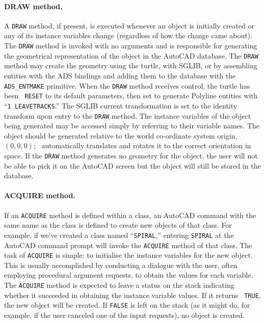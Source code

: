 \documentclass{article}
\begin{document}
\paragraph{DRAW method.}  A {\tt DRAW} method, if present, is executed
        whenever an object is initially created or any of its instance
        variables change (regardless of how the change came about).
        The {\tt DRAW} method is invoked with no arguments and is
        responsible for generating the geometrical representation of
        the object in the AutoCAD database.  The {\tt DRAW} method may
        create the geometry using the turtle, with SGLIB, or by
        assembling entities with the ADS bindings and adding them to
        the database with the \verb+ADS_ENTMAKE+ primitive.  When the
        {\tt DRAW} method receives control, the turtle has been {\tt
        RESET} to its default parameters, then set to generate
        Polyline entities with ``{\tt 1 LEAVETRACKS}\@.''  The SGLIB
        current transformation is set to the identity transform upon
        entry to the {\tt DRAW} method.  The instance variables of the
        object being generated may be accessed simply by referring to
        their variable names.  The object should be generated relative
        to the world co-ordinate system origin, $(0,0,0)$; \cw\
        automatically translates and rotates it to the correct
        orientation in space.  If the {\tt DRAW} method
        generates no geometry for the object, the user will not be
        able to pick it on the AutoCAD screen but the object will
        still be stored in the database.

\paragraph{ACQUIRE method.}  If an {\tt ACQUIRE} method is defined
        within a class, an AutoCAD command with the same name as the
        class is defined to create new objects of that class.  For
        example, if we've created a class named ``{\tt SPIRAL},''
        entering {\tt SPIRAL} at the AutoCAD command prompt will
        invoke the {\tt ACQUIRE} method of that class.  The task of
        {\tt ACQUIRE} is simple: to initialise the instance
        variables for the new object.  This is usually accomplished by
        conducting a dialogue with the user, often employing
        procedural argument requests, to obtain the values for
        each variable.  The {\tt ACQUIRE} method is expected to leave
        a status on the stack indicating whether it succeeded in
        obtaining the instance variable values.  If it returns {\tt
        TRUE}, the new object will be created.  If {\tt FALSE} is left
        on the stack (as it might do, for example, if the user
        canceled one of the input requests), no object is created.
\end{document}
